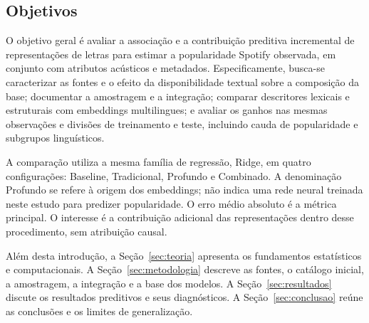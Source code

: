 \subsection{Objetivos}
O objetivo geral é avaliar a associação e a contribuição preditiva incremental de representações de letras para estimar a popularidade Spotify observada, em conjunto com atributos acústicos e metadados. Especificamente, busca-se caracterizar as fontes e o efeito da disponibilidade textual sobre a composição da base; documentar a amostragem e a integração; comparar descritores lexicais e estruturais com embeddings multilingues; e avaliar os ganhos nas mesmas observações e divisões de treinamento e teste, incluindo cauda de popularidade e subgrupos linguísticos.

A comparação utiliza a mesma família de regressão, Ridge, em quatro configurações: Baseline, Tradicional, Profundo e Combinado. A denominação Profundo se refere à origem dos embeddings; não indica uma rede neural treinada neste estudo para predizer popularidade. O erro médio absoluto é a métrica principal. O interesse é a contribuição adicional das representações dentro desse procedimento, sem atribuição causal.

Além desta introdução, a Seção~\ref{sec:teoria} apresenta os fundamentos estatísticos e computacionais. A Seção~\ref{sec:metodologia} descreve as fontes, o catálogo inicial, a amostragem, a integração e a base dos modelos. A Seção~\ref{sec:resultados} discute os resultados preditivos e seus diagnósticos. A Seção~\ref{sec:conclusao} reúne as conclusões e os limites de generalização.
